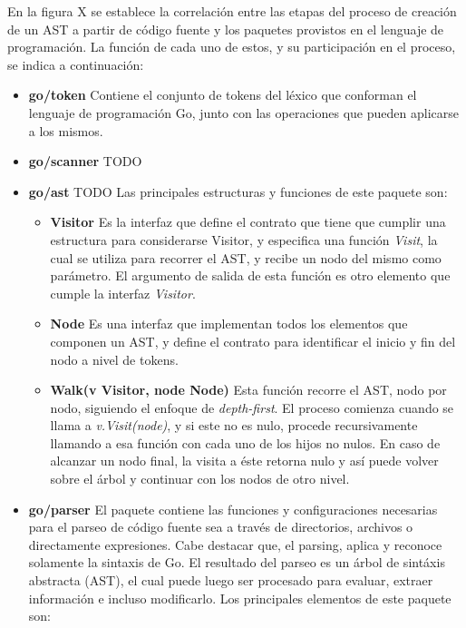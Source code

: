 En la figura X se establece la correlación entre las etapas del proceso de creación de un AST a partir de código fuente y los paquetes provistos en el lenguaje de programación.
La función de cada uno de estos, y su participación en el proceso, se indica a continuación:
\begin{itemize}
  \item \textbf{go/token} Contiene el conjunto de tokens del léxico que conforman el lenguaje de programación Go, junto con las operaciones que pueden aplicarse a los mismos.
  
  \item \textbf{go/scanner} TODO
  
  \item \textbf{go/ast} TODO
  Las principales estructuras y funciones de este paquete son:
  \begin{itemize}
    \item \textbf{Visitor} Es la interfaz que define el contrato que tiene que cumplir una estructura para considerarse Visitor, y especifica una función \textit{Visit}, la cual se utiliza para recorrer el AST, y recibe un nodo del mismo como parámetro.
    El argumento de salida de esta función es otro elemento que cumple la interfaz \textit{Visitor}.

    \item \textbf{Node} Es una interfaz que implementan todos los elementos que componen un AST, y define el contrato para identificar el inicio y fin del nodo a nivel de tokens.

    \item \textbf{Walk(v Visitor, node Node)} Esta función recorre el AST, nodo por nodo, siguiendo el enfoque de \textit{depth-first}.
    El proceso comienza cuando se llama a \textit{v.Visit(node)}, y si este no es nulo, procede recursivamente llamando a esa función con cada uno de los hijos no nulos.
    En caso de alcanzar un nodo final, la visita a éste retorna nulo y así puede volver sobre el árbol y continuar con los nodos de otro nivel.
  \end{itemize}
  
  \item \textbf{go/parser} El paquete contiene las funciones y configuraciones necesarias para el parseo de código fuente sea a través de directorios, archivos o directamente expresiones. Cabe destacar que, el parsing, aplica y reconoce solamente la sintaxis de Go.
  El resultado del parseo es un árbol de sintáxis abstracta (AST), el cual puede luego ser procesado para evaluar, extraer información e incluso modificarlo.
  Los principales elementos de este paquete son:


\end{itemize}
